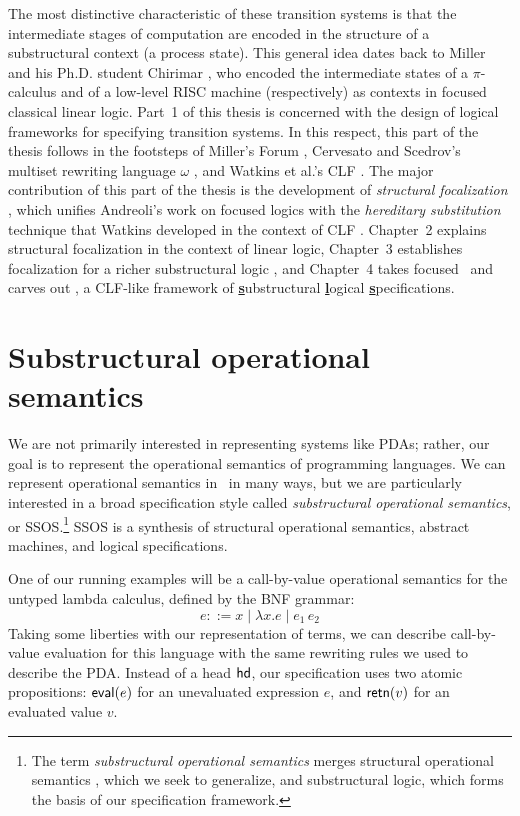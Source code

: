 The most distinctive characteristic of these transition systems is
that the intermediate stages of computation are encoded in the
structure of a substructural context (a process state). This general
idea dates back to Miller \cite{miller92pi} and his Ph.D. student
Chirimar \cite{chirimar95proof}, who encoded the intermediate states
of a $\pi$-calculus and of a low-level RISC machine (respectively) as
contexts in focused classical linear logic.  Part~1 of this thesis is
concerned with the design of logical frameworks for specifying
transition systems.  In this respect, this part of the thesis follows
in the footsteps of Miller's Forum \cite{miller96forum}, Cervesato and
Scedrov's multiset rewriting language $\omega$
\cite{cervesato09relating}, and Watkins et al.'s CLF
\cite{watkins02concurrent}. The major contribution of this part of the
thesis is the development of {\it structural focalization}
\cite{simmons11structural}, which unifies Andreoli's work on focused
logics \cite{andreoli92logic} with the {\it hereditary substitution}
technique that Watkins developed in the context of CLF
\cite{watkins02concurrent}. Chapter~2 explains structural focalization
in the context of linear logic, Chapter~3 establishes focalization for
a richer substructural logic \ollll, and Chapter~4 takes focused
\ollll~and carves out \sls, a CLF-like framework of \underline{\bf
  s}ubstructural \underline{\bf l}ogical \underline{\bf
  s}pecifications.

\section{Substructural operational semantics}
\label{sec:intro-ssos}

We are not primarily interested in representing systems like PDAs;
rather, our goal is to represent the operational semantics of
programming languages. We can represent operational semantics in
\sls~in many ways, but we are particularly interested in a broad
specification style called {\it substructural operational semantics},
or SSOS.\footnote{The term {\it substructural operational semantics}
  merges structural operational semantics \cite{plotkin04structural},
  which we seek to generalize, and substructural logic, which forms
  the basis of our specification framework.} SSOS is a synthesis of
structural operational semantics, abstract machines, and logical
specifications.

One of our running
examples will be a call-by-value operational semantics for the untyped
lambda calculus, defined by the BNF grammar:
\[
e ::= x \mid \lambda x.e \mid e_1\,e_2
\]
Taking some liberties with our representation of terms, we can
describe call-by-value evaluation for this language with the same
rewriting rules we used to describe the PDA. Instead of a head ${\sf
  hd}$, our specification uses two atomic propositions: ${\sf
  eval}(e)$ for an unevaluated expression $e$, and ${\sf retn}(v)$
for an evaluated value $v$.


